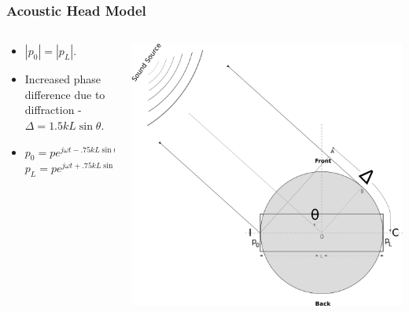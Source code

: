 \documentclass{beamer}
\begin{document}
\begin{frame}[t]
 \frametitle{Acoustic Head Model}
 \begin{columns}
     \begin{column}{.5\textwidth}
    \small
    \flushleft
     \begin{itemize}
      \item $|p_0|=|p_L|$.
      \item Increased  phase difference due to diffraction - $\Delta=1.5kL\sin\theta$.
      \item $p_0=pe^{j\omega t -.75kL\sin\theta}$\\ $p_L=pe^{j\omega t +.75kL\sin\theta}$
      \end{itemize}

    \end{column}
    
 \begin{column}{0.5\textwidth}
    \includegraphics[width = 6 cm]{Diagrams/Presentation/acousticheadmodel2.png}\\
    \end{column}

    \end{columns}
\end{frame}
\end{document}

